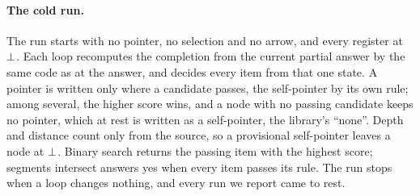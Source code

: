 \paragraph{The cold run.} The run starts with no pointer, no selection and no arrow, and every register at $\bot$.
Each loop recomputes the completion from the current partial answer by the same code as at the answer, and decides every
item from that one state. A pointer is written only where a candidate passes, the self-pointer by its own rule; among
several, the higher score wins, and a node with no passing candidate keeps no pointer, which at rest is written as a
self-pointer, the library's ``none''. Depth and distance count only from the source, so a provisional self-pointer
leaves a node at $\bot$. Binary search returns the passing item with the highest score; segments intersect answers
yes when every item passes its rule. The run stops when a loop changes nothing, and every run we report came to rest.

